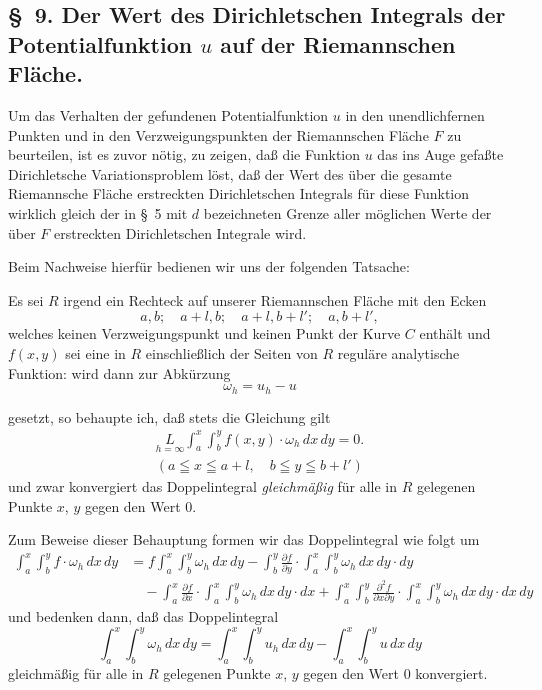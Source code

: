 \documentclass{article}
\begin{document}
\subsection*{§~9. Der Wert des Dirichletschen Integrals der Potentialfunktion $u$ auf der Riemannschen Fläche.}

Um das Verhalten der gefundenen Potentialfunktion $u$ in den unendlichfernen Punkten und in den Verzweigungspunkten der Riemannschen Fläche $F$ zu beurteilen, ist es zuvor nötig, zu zeigen, daß die Funktion $u$ das ins Auge gefaßte Dirichletsche Variationsproblem löst, daß der Wert des über die gesamte Riemannsche Fläche erstreckten Dirichletschen Integrals für diese Funktion wirklich gleich der in §~5 mit $d$ bezeichneten Grenze aller möglichen Werte der über $F$ erstreckten Dirichletschen Integrale wird.

Beim Nachweise hierfür bedienen wir uns der folgenden Tatsache:

Es sei $R$ irgend ein Rechteck auf unserer Riemannschen Fläche mit den Ecken
\[
a, b; \quad a+l, b; \quad a+l, b+l'; \quad a, b+l',
\]
welches keinen Verzweigungspunkt und keinen Punkt der Kurve $C$ enthält und $f(x, y)$ sei eine in $R$ einschließlich der Seiten von $R$ reguläre analytische Funktion: wird dann zur Abkürzung
\[
\omega_h = u_h - u
\]

gesetzt, so behaupte ich, daß stets die Gleichung gilt
\[
\begin{gathered}
\underset{h=\infty}{L} \int_a^x \int_b^y f(x, y) \cdot \omega_h\,dx\,dy = 0. \\
(a \leqq x \leqq a+l, \quad b \leqq y \leqq b+l')
\end{gathered}
\]
und zwar konvergiert das Doppelintegral \emph{gleichmäßig} für alle in $R$ gelegenen Punkte $x$, $y$ gegen den Wert 0.

Zum Beweise dieser Behauptung formen wir das Doppelintegral wie folgt um
\[
\begin{aligned}
\int_a^x \int_b^y f \cdot \omega_h\,dx\,dy &= f \int_a^x \int_b^y \omega_h\,dx\,dy - \int_b^y \frac{\partial f}{\partial y} \cdot \int_a^x \int_b^y \omega_h\,dx\,dy \cdot dy \\
&\quad - \int_a^x \frac{\partial f}{\partial x} \cdot \int_a^x \int_b^y \omega_h\,dx\,dy \cdot dx + \int_a^x \int_b^y \frac{\partial^2 f}{\partial x \partial y} \cdot \int_a^x \int_b^y \omega_h\,dx\,dy \cdot dx\,dy
\end{aligned}
\]
und bedenken dann, daß das Doppelintegral
\[
\int_a^x \int_b^y \omega_h\,dx\,dy = \int_a^x \int_b^y u_h\,dx\,dy - \int_a^x \int_b^y u\,dx\,dy
\]
gleichmäßig für alle in $R$ gelegenen Punkte $x$, $y$ gegen den Wert 0 konvergiert.
\end{document}
